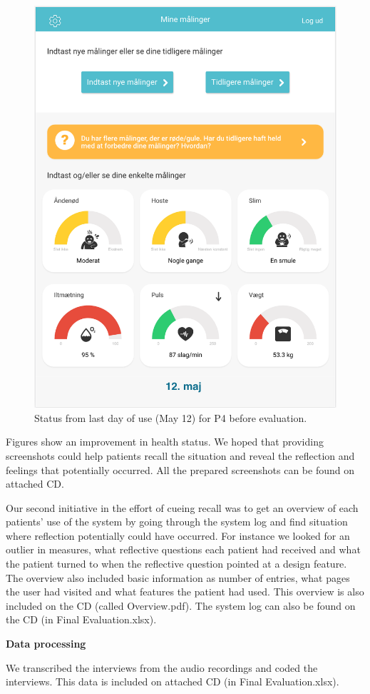 \begin{figure}[h]
\begin{minipage}[b]{0.45\textwidth}
    \includegraphics[width=\textwidth]{images/study3/Gunnar22.png}
    \caption{Status from last day of use (May 12) for P4 before evaluation.}
    \label{fig:gunnar22}
  \end{minipage}
\end{figure}

Figures show an improvement in health status. We hoped that providing screenshots could help patients recall the situation and reveal the reflection and feelings that potentially occurred. 
All the prepared screenshots can be found on attached CD.

Our second initiative in the effort of cueing recall was to get an overview of each patients' use of the system by going through the system log and find situation where reflection potentially could have occurred. For instance we looked for an outlier in measures, what reflective questions each patient had received and what the patient turned to when the reflective question pointed at a design feature. The overview also included basic information as number of entries, what pages the user had visited and what features the patient had used. This overview is also included on the CD (called Overview.pdf). The system log can also be found on the CD (in Final Evaluation.xlsx).

\textbf{Data processing}

We transcribed the interviews from the audio recordings and coded the interviews. This data is included on attached CD (in Final Evaluation.xlsx).